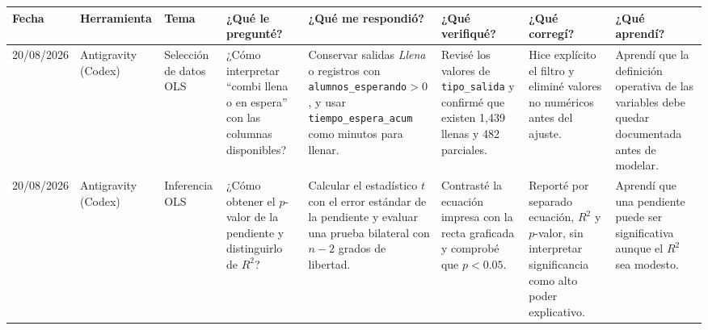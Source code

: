 \newpage
\begin{landscape}
\begin{center}
	\label{tab:bitacora_continuacion}
	\vspace{0.2em}
	\fontsize{7pt}{8.2pt}\selectfont
	\setlength{\tabcolsep}{3pt}
	\renewcommand{\arraystretch}{0.95}
	\begin{tabularx}{\linewidth}{p{1.3cm} p{1.6cm} p{1.6cm} X X X X X}
		\toprule
		\rowcolor{purpleUPP!10!white}
		\textbf{Fecha} & \textbf{Herramienta} & \textbf{Tema} & \textbf{¿Qué le pregunté?} & \textbf{¿Qué me respondió?} & \textbf{¿Qué verifiqué?} & \textbf{¿Qué corregí?} & \textbf{¿Qué aprendí?} \\
		\midrule
		20/08/2026 & Antigravity (Codex) & Selección de datos OLS & ¿Cómo interpretar ``combi llena o en espera'' con las columnas disponibles? & Conservar salidas \textit{Llena} o registros con \texttt{alumnos\_esperando}$>0$, y usar \texttt{tiempo\_espera\_acum} como minutos para llenar. & Revisé los valores de \texttt{tipo\_salida} y confirmé que existen 1,439 llenas y 482 parciales. & Hice explícito el filtro y eliminé valores no numéricos antes del ajuste. & Aprendí que la definición operativa de las variables debe quedar documentada antes de modelar. \\
		\midrule
		20/08/2026 & Antigravity (Codex) & Inferencia OLS & ¿Cómo obtener el $p$-valor de la pendiente y distinguirlo de $R^2$? & Calcular el estadístico $t$ con el error estándar de la pendiente y evaluar una prueba bilateral con $n-2$ grados de libertad. & Contrasté la ecuación impresa con la recta graficada y comprobé que $p<0.05$. & Reporté por separado ecuación, $R^2$ y $p$-valor, sin interpretar significancia como alto poder explicativo. & Aprendí que una pendiente puede ser significativa aunque el $R^2$ sea modesto. \\
		\bottomrule
	\end{tabularx}
\end{center}
\end{landscape}
